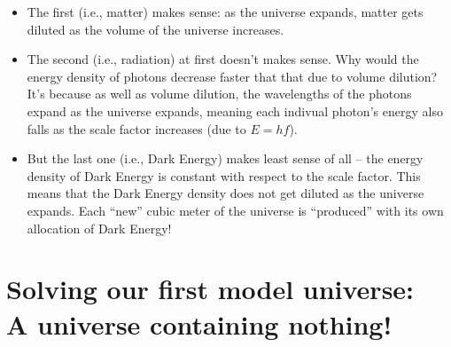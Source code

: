 \documentclass[11pt]{article}
\begin{document}
\begin{itemize}
\begin{itemize}
\end{itemize}
\item The first (i.e., matter) makes sense: as the universe expands, matter gets diluted as the volume of the universe increases.
\item The second (i.e., radiation) at first doesn't makes sense. Why would the energy density of photons decrease faster that that due to volume dilution? It's because as well as volume dilution, the wavelengths of the photons expand as the universe expands, meaning each indivual photon's energy also falls as the scale factor increases (due to $E=hf$).
\item But the last one (i.e., Dark Energy) makes least sense of all -- the energy density of Dark Energy is constant with respect to the scale factor. This means that the Dark Energy density does not get diluted as the universe expands. Each ``new'' cubic meter of the universe is ``produced'' with its own allocation of Dark Energy!
\end{itemize}

\section{Solving our first model universe:\\
A universe containing nothing!}
\end{document}
